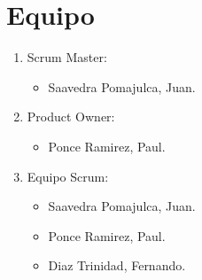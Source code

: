 \chapter{Equipo}

\begin{enumerate}
 \item Scrum Master:
 		\begin{itemize}
 		\item Saavedra Pomajulca, Juan.
 		\end{itemize}
 \item Product Owner:
 		 \begin{itemize}
 		 	\item Ponce Ramirez, Paul.
 		 \end{itemize}
 \item Equipo Scrum:
	 	\begin{itemize}
	 		\item Saavedra Pomajulca, Juan.
	 		\item Ponce Ramirez, Paul.
	 		\item Diaz Trinidad, Fernando.
	 	\end{itemize}
\end{enumerate}
